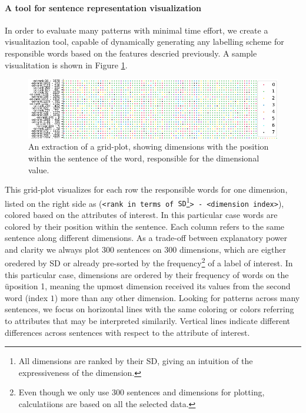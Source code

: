 \paragraph*{A tool for sentence representation visualization}
In order to evaluate many patterns with minimal time effort, we create a visualitazion tool, capable of dynamically generating any labelling scheme for responsible words based on the features descried previously. A sample visualitation is shown in Figure \ref{fig:find_position_1}.
\begin{figure}[tph!]
\centering
	\includegraphics[totalheight=4cm]{fig/finpone.png}
	\caption{An extraction of a grid-plot, showing dimensions with the position within the sentence of the word, responsible for the dimensional value.}
	\label{fig:find_position_1}
\end{figure}
This grid-plot visualizes for each row the responsible words for one dimension, listed on the right side as (\texttt{<rank in terms of \ac{SD}}\footnote{All dimensions are ranked by their \ac{SD}, giving an intuition of the expressiveness of the dimension.}\texttt{> - <dimension index>}), colored based on the attributes of interest. In this particular case words are colored by their position within the sentence.  Each column refers to the same sentence along different dimensions. As a trade-off between explanatory power and clarity we always plot 300 sentences on 300 dimensions, which are eigther oredered by \ac{SD} or already pre-sorted by the frequency\footnote{Even though we only use 300 sentences and dimensions for plotting, calculatiions are based on all the selected data.} of a label of interest. In this particular case, dimensions are ordered by their frequency of words on the üposition 1, meaning the upmost dimension received its values from the second word (index $1$) more than any other dimension. Looking for patterns across many sentences, we focus on horizontal lines with the same coloring or colors referring to attributes that may be interpreted similarily. Vertical lines indicate different differences across sentences with respect to the attribute of interest.


